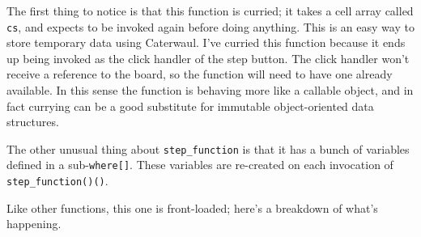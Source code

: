 \documentclass{report}
\begin{document}
      The first thing to notice is that this function is curried; it takes a cell array called {\tt cs}, and expects to be invoked again before doing anything. This is an easy way to store
      temporary data using Caterwaul. I've curried this function because it ends up being invoked as the click handler of the step button. The click handler won't receive a reference to the
      board, so the function will need to have one already available. In this sense the function is behaving more like a callable object, and in fact currying can be a good substitute for
      immutable object-oriented data structures.

      The other unusual thing about \verb|step_function| is that it has a bunch of variables defined in a sub-{\tt where[]}. These variables are re-created on each invocation of
      \verb|step_function()()|.

      Like other functions, this one is front-loaded; here's a breakdown of what's happening.
\end{document}
